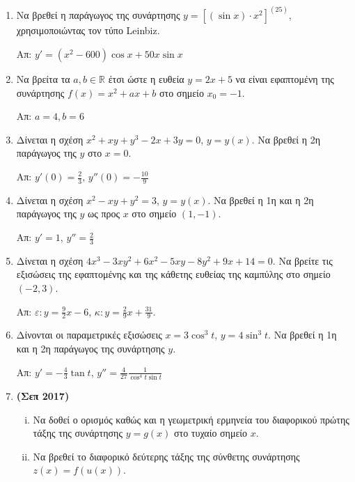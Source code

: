 \begin{enumerate}
  \item Να βρεθεί η παράγωγος της συνάρτησης $ y= \left[(\sin{x}) \cdot
    x^{2}\right]^{(25)}$, χρησιμοποιώντας τον τύπο Leinbiz.

    \hfill Απ: $ y' = (x^{2} - 600) \cos{x} + 50 x \sin{x} $

  \item Να βρείτα τα $ a, b \in \mathbb{R} $ έτσι ώστε η ευθεία $ y = 2x + 5
    $ να είναι εφαπτομένη της συνάρτησης $ f(x) = x^{2} + ax + b $ στο
    σημείο $ x_{0} = -1 $. 

    \hfill Απ: $ a = 4, b = 6 $

  \item Δίνεται η σχέση $ x^{2} + xy + y^{3} -2x + 3y = 0 $, $ y=y(x) $. Να βρεθεί η
    2η παράγωγος της $y$ στο $ x=0 $. 

    \hfill Απ: $ y'(0) = \frac{2}{3} $, $ y''(0) = -\frac{10}{9} $ 

  \item Δίνεται η σχέση $ x^{2} - xy + y^{2} = 3 $, $ y=y(x) $. Να βρεθεί η 1η
    και η 2η παράγωγος της $y$ ως προς $x$ στο σημείο $ (1,-1) $.

    \hfill Απ: $ y' = 1$, $ y'' = \frac{2}{3} $

  \item Δίνεται η σχέση $ 4x^{3} - 3xy^{2} + 6x^{2} - 5xy - 8 y^{2} + 9x + 14
    = 0$. Να βρείτε τις εξισώσεις της εφαπτομένης και της κάθετης ευθείας
    της καμπύλης στο σημείο $ (-2,3) $.

    \hfill Απ: $\varepsilon\colon y = \frac{9}{2} x - 6 $, $\kappa\colon y = \frac{2}{9} x +
    \frac{31}{9} $.

  \item Δίνονται οι παραμετρικές εξισώσεις $ x = 3 \cos^{3}{t} $, $ y = 4
    \sin^{3}{t}	$. Να βρεθεί η 1η και η 2η παράγωγος της συνάρτησης $y$.

    \hfill Απ: $ y' = -\frac{4}{3} \tan{t} $, $ y'' = \frac{4}{27}
    \frac{1}{\cos^{4}t \sin{t}} $ 

  \item {\bfseries (Σεπ 2017)}
    \begin{enumerate}[i)]
      \item Να δοθεί ο ορισμός καθώς και η γεωμετρική
        ερμηνεία του διαφορικού πρώτης τάξης της συνάρτησης $ y = g(x) $ στο
        τυχαίο σημείο $x$. 
      \item Να βρεθεί το διαφορικό δεύτερης τάξης της σύνθετης συνάρτησης $ z(x) =
        f(u(x))	$.
    \end{enumerate}


\end{enumerate}
